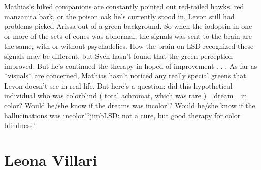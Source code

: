 \documentclass[12pt]{book}
\begin{document}
Mathias's hiked companions are constantly pointed out red-tailed hawks, red manzanita bark, or the poison oak he's currently stood in, Levon still had problems picked Arissa out of a green background. So when the iodopsin in one or more of the sets of cones was abnormal, the signals was sent to the brain are the same, with or without psychadelics. How the brain on LSD recognized these signals may be different, but Sven hasn't found that the green perception improved. But he's continued the therapy in hoped of improvement . . .  As far as *visuals* are concerned, Mathias hasn't noticed any really special greens that Levon doesn't see in real life. But here's a question: did this hypothetical individual who was colorblind ( total achromat, which was rare ) \_dream\_ in color? Would he/she know if the dreams was incolor'? Would he/she know if the hallucinations was incolor'?jimbLSD: not a cure, but good therapy for color blindness.'



\chapter{Leona Villari}
\end{document}
